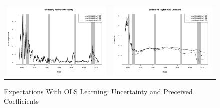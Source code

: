 \documentclass[12pt]{article}
\begin{document}
\begin{figure}\caption{Expectations With OLS Learning: Uncertainty and Preceived Coefficients}\label{fg:coefs_ols}\vspace*{1pc}
\hspace*{-0.6in}\begin{tabular}{cc}
\includegraphics[scale=0.4]{mpu_ols.png} & \includegraphics[scale=0.4]{coef_constant_ols.png} \\ [1pc]

\end{tabular}
\end{figure}
\end{document}
